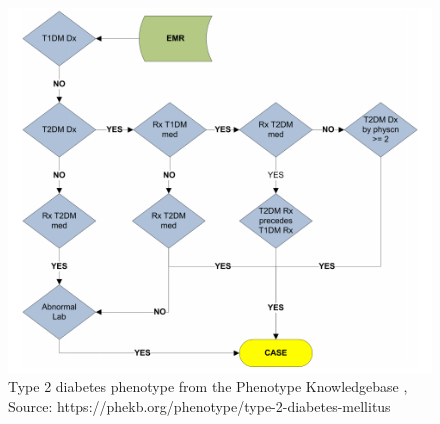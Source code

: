 \documentclass{sig-alternate}
\begin{document}
\begin{figure} [t]
\centering
\includegraphics[width=\linewidth]{t2d-pheno.png}
\caption{Type 2 diabetes phenotype from the Phenotype Knowledgebase \cite{kho_use_2012}, Source: https://phekb.org/phenotype/type-2-diabetes-mellitus}
\label{fig:t2d-pheno}
\end{figure}
\end{document}

